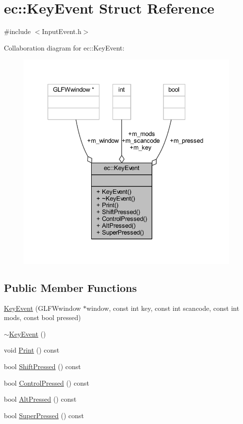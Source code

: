 \hypertarget{structec_1_1_key_event}{}\section{ec\+:\+:Key\+Event Struct Reference}
\label{structec_1_1_key_event}


{\ttfamily \#include $<$Input\+Event.\+h$>$}



Collaboration diagram for ec\+:\+:Key\+Event\+:\nopagebreak
\begin{figure}[H]
\begin{center}
\leavevmode
\includegraphics[width=333pt]{structec_1_1_key_event__coll__graph}
\end{center}
\end{figure}
\subsection*{Public Member Functions}
\begin{DoxyCompactItemize}
\item 
\mbox{\hyperlink{structec_1_1_key_event_a679ba7a0050b6514a3a6a110b4128562}{Key\+Event}} (G\+L\+F\+Wwindow $\ast$window, const int key, const int scancode, const int mods, const bool pressed)
\item 
\mbox{\hyperlink{structec_1_1_key_event_a2e9713c01afb046dc2504f17ce42e386}{$\sim$\+Key\+Event}} ()
\item 
void \mbox{\hyperlink{structec_1_1_key_event_ae57433e16a6e51ca2fe57a41de0cf370}{Print}} () const
\item 
bool \mbox{\hyperlink{structec_1_1_key_event_af8fb773cf9944c9ef22be92b4cf68062}{Shift\+Pressed}} () const
\item 
bool \mbox{\hyperlink{structec_1_1_key_event_af80f845419fb29c9b47a13cd7354bc27}{Control\+Pressed}} () const
\item 
bool \mbox{\hyperlink{structec_1_1_key_event_a6881e3dfbb485fdaed76e78663c7a106}{Alt\+Pressed}} () const
\item 
bool \mbox{\hyperlink{structec_1_1_key_event_ac6af6ede353055619a6f7c14b83918cc}{Super\+Pressed}} () const
\end{DoxyCompactItemize}
